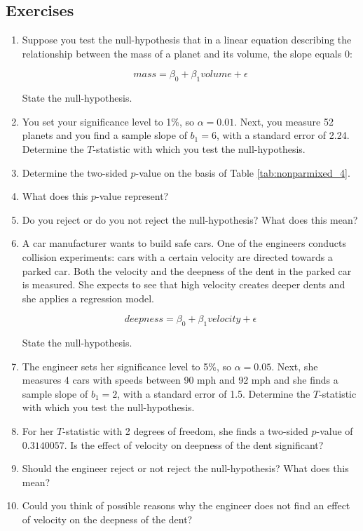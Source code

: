 \documentclass[]{book}\usepackage[]{graphicx}\usepackage[]{color}
\begin{document}
\subsection{Exercises}

\begin{enumerate}

\item Suppose you test the null-hypothesis that in a linear equation describing the relationship between the mass of a planet and its volume, the slope equals 0:

\begin{equation}
mass = \beta_0 + \beta_1 volume + \epsilon
\end{equation}

State the null-hypothesis.


\item You set your significance level to 1\%, so $\alpha=0.01$. Next, you measure 52 planets and you find a sample slope of $b_1=6$, with a standard error of 2.24. Determine the $T$-statistic with which you test the null-hypothesis.

\item Determine the two-sided $p$-value on the basis of Table \ref{tab:nonparmixed_4}.

\item What does this $p$-value represent? 

\item Do you reject or do you not reject the null-hypothesis? What does this mean?

\item A car manufacturer wants to build safe cars. One of the engineers conducts collision experiments: cars with a certain velocity are directed towards a parked car. Both the velocity and the deepness of the dent in the parked car is measured. She expects to see that high velocity creates deeper dents and she applies a regression model.

\begin{equation}
deepness = \beta_0 + \beta_1 velocity + \epsilon
\end{equation}

State the null-hypothesis.

\item The engineer sets her significance level to 5\%, so $\alpha=0.05$. Next, she measures 4 cars with speeds between 90 mph and 92 mph and she finds a sample slope of $b_1=2$, with a standard error of 1.5. Determine the $T$-statistic with which you test the null-hypothesis.

\item For her $T$-statistic with 2 degrees of freedom, she finds a two-sided $p$-value of $0.3140057$. Is the effect of velocity on deepness of the dent significant?

\item Should the engineer reject or not reject the null-hypothesis? What does this mean?

\item Could you think of possible reasons why the engineer does not find an effect of velocity on the deepness of the dent?

\end{enumerate}
\end{document}
